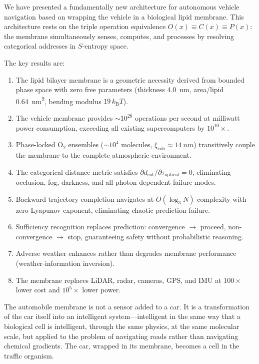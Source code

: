 \documentclass[12pt]{article}
\theoremstyle{definition}
\theoremstyle{remark}
\newcommand{\kB}{k_{\mathrm{B}}}
\newcommand{\dcat}{d_{\mathrm{cat}}}
\newcommand{\xicoh}{\xi_{\mathrm{coh}}}
\begin{document}
We have presented a fundamentally new architecture for autonomous vehicle navigation based on wrapping the vehicle in a biological lipid membrane. This architecture rests on the triple operation equivalence $O(x) \equiv C(x) \equiv P(x)$: the membrane simultaneously senses, computes, and processes by resolving categorical addresses in $S$-entropy space.

The key results are:

\begin{enumerate}[label=(\roman*)]
  \item The lipid bilayer membrane is a geometric necessity derived from bounded phase space with zero free parameters (thickness \SI{4.0}{nm}, area/lipid \SI{0.64}{nm^2}, bending modulus $19\,\kB T$).

  \item The vehicle membrane provides $\sim 10^{28}$ operations per second at milliwatt power consumption, exceeding all existing supercomputers by $10^{10}\times$.

  \item Phase-locked $\mathrm{O}_2$ ensembles ($\sim 10^4$ molecules, $\xicoh \approx \SI{14}{nm}$) transitively couple the membrane to the complete atmospheric environment.

  \item The categorical distance metric satisfies $\partial\dcat/\partial\tau_{\mathrm{optical}} = 0$, eliminating occlusion, fog, darkness, and all photon-dependent failure modes.

  \item Backward trajectory completion navigates at $O(\log_3 N)$ complexity with zero Lyapunov exponent, eliminating chaotic prediction failure.

  \item Sufficiency recognition replaces prediction: convergence $\to$ proceed, non-convergence $\to$ stop, guaranteeing safety without probabilistic reasoning.

  \item Adverse weather enhances rather than degrades membrane performance (weather-information inversion).

  \item The membrane replaces LiDAR, radar, cameras, GPS, and IMU at $100\times$ lower cost and $10^5\times$ lower power.
\end{enumerate}

The automobile membrane is not a sensor added to a car. It is a transformation of the car itself into an intelligent system---intelligent in the same way that a biological cell is intelligent, through the same physics, at the same molecular scale, but applied to the problem of navigating roads rather than navigating chemical gradients. The car, wrapped in its membrane, becomes a cell in the traffic organism.
\end{document}
